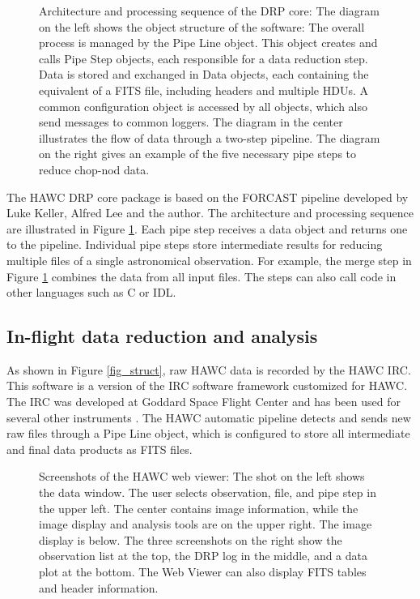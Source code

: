 \documentclass[11pt,twoside]{article}
\begin{document}
\begin{figure}[!ht]
\caption{Architecture and processing sequence of the DRP core: The
  diagram on the left shows the object structure of the software: The
  overall process is managed by the Pipe Line object. This object
  creates and calls Pipe Step objects, each responsible for a data
  reduction step. Data is stored and exchanged in Data objects, each
  containing the equivalent of a FITS file, including headers and
  multiple HDUs. A common configuration object is accessed by all
  objects, which also send messages to common loggers. The diagram in
  the center illustrates the flow of data through a two-step
  pipeline. The diagram on the right gives an example of the five
  necessary pipe steps to reduce chop-nod data.}

\label{fig_core}
\end{figure}

The HAWC DRP core package is
based on the FORCAST pipeline developed by Luke Keller, Alfred Lee
and the author.
The architecture and processing sequence are
illustrated in Figure \ref{fig_core}. Each pipe step receives a data
object and returns one to the pipeline. Individual pipe steps store
intermediate results for reducing multiple files of a single
astronomical observation. For example, the merge step in Figure
\ref{fig_core} combines the data from all input files. The steps can
also call code in other languages such as C or IDL.

\subsection{In-flight data reduction and analysis}

As shown in Figure \ref{fig_struct}, raw HAWC data is recorded by the
HAWC IRC. This software is a version of the IRC software framework
customized for HAWC. The IRC was developed at Goddard Space Flight
Center and has been used for several other instruments
\citep[see][]{staguhn06}. The HAWC automatic pipeline detects and
sends new raw files through a Pipe Line object, which is configured
to store all intermediate and final data products as FITS files.

\begin{figure}[!ht]

\caption{Screenshots of the HAWC web viewer: The shot on the left
  shows the data window. The user selects observation, file, and pipe
  step in the upper left. The center contains image information, while
  the image display and analysis tools are on the upper right. The
  image display is below. The three screenshots on the right show the
  observation list at the top, the DRP log in the middle, and a data
  plot at the bottom. The Web Viewer can also display FITS tables and
  header information.}

\label{fig_screen}

\end{figure}
\end{document}
